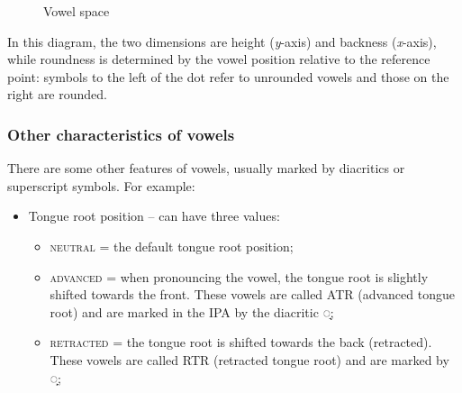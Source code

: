 \begin{refsection}
\begin{figure}
\caption{Vowel space}
\label{fig:vowel-space}
\end{figure}

In this diagram, the two dimensions are height (\textit{y}-axis) and backness (\textit{x}-axis), while roundness is determined by the vowel position relative to the reference point: symbols to the left of the dot refer to unrounded vowels and those on the right are rounded.

\subsubsection{Other characteristics of vowels}

There are some other features of vowels, usually marked by diacritics or superscript symbols. For example:

\begin{itemize}
    \item Tongue root position -- can have three values:
\begin{itemize}
    \item \textsc{neutral} = the default tongue root position;
    \item \textsc{advanced} = when pronouncing the vowel, the tongue root is slightly shifted towards the front. These vowels are called ATR (advanced tongue root) and are marked in the IPA by the diacritic ◌̘;%
    \item \textsc{retracted} = the tongue root is shifted towards the back (retracted). These vowels are called RTR (retracted tongue root) and are marked by ◌̙; %
\end{itemize}


\end{itemize}
\end{refsection}
